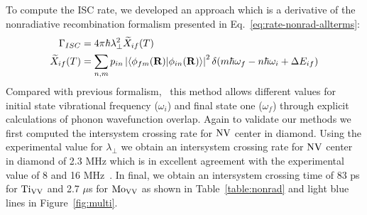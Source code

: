 To compute the ISC rate, we developed an approach which is a derivative of the nonradiative recombination formalism presented in Eq.~\ref{eq:rate-nonrad-allterms}:
\begin{align}
    \Gamma_{ISC} &= 4 \pi \hbar \lambda_\perp^2 \widetilde{X}_{if}(T) \label{eq:isc-full}\\
    \widetilde{X}_{if}(T) &= \sum_{n,m}p_{in} \left|
        \braket{\phi_{fm}(\textbf{R})}{\phi_{in}(\mathbf{R})}
    \right|^2 \delta(m\hbar\omega_f - n\hbar\omega_i+\Delta E_{if}) \label{eq:isc-F}
\end{align}
Compared with previous formalism,~\cite{thiering2017ab} this method
allows different values for initial state vibrational frequency ($\omega_i$) and final state one ($\omega_f$) through explicit calculations of phonon wavefunction overlap. Again to validate our methods we first computed the intersystem crossing rate for $\text{NV}$ center in diamond. Using the experimental value for $\lambda_\perp$ we obtain an intersystem crossing rate for $\text{NV}$ center in diamond of 2.3 MHz which is in excellent agreement with the experimental value of 8 and 16 MHz~\cite{goldman2015phonon}.
In final, we obtain an intersystem crossing time of 83 ps for $\text{Ti}_{\text{V}\text{V}}$ and 2.7 $\mu$s for $\text{Mo}_{\text{V}\text{V}}$ as shown in Table~\ref{table:nonrad} and light blue lines in Figure~\ref{fig:multi}.

